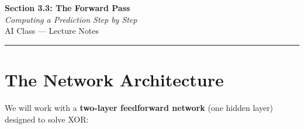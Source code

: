 \documentclass[12pt, a4paper]{article}
\newif\ifstudentmode
\theoremstyle{definition}
\begin{document}
\begin{center}
  {\LARGE \textbf{Section 3.3: The Forward Pass}} \\[0.3em]
  {\large\itshape Computing a Prediction Step by Step} \\[0.5em]
  {\large AI Class --- Lecture Notes}%
  \ifstudentmode
    \quad {\normalsize\color{gray}[Student Copy]}%
  \fi
\end{center}

\vspace{1em}
\hrule
\vspace{1.5em}

\section{The Network Architecture}

We will work with a \textbf{two-layer feedforward network} (one hidden layer)
designed to solve XOR:
\end{document}
